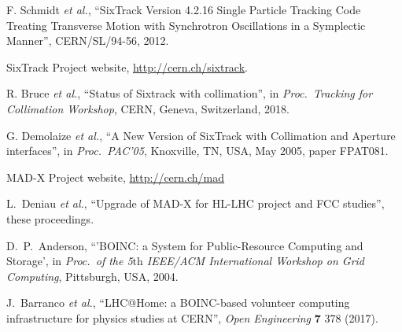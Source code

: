 \documentclass{ws-ijmpa}
\begin{document}
\begin{thebibliography}{99}


F. Schmidt {\it et al.},
``SixTrack Version 4.2.16 Single Particle Tracking Code Treating Transverse Motion with Synchrotron Oscillations in a Symplectic Manner'',
CERN/SL/94-56, 2012.

SixTrack Project website,
\url{http://cern.ch/sixtrack}.

R. Bruce {\it et al.},
``Status of Sixtrack with collimation'',
in \emph{Proc.~Tracking for Collimation Workshop}, CERN, Geneva, Switzerland, 2018.


G. Demolaize {\it et al.}, ``A New Version of SixTrack with Collimation and Aperture interfaces'', in {\it Proc.~PAC'05}, Knoxville, TN, USA, May 2005, paper FPAT081.

MAD-X Project website, \url{http://cern.ch/mad}


L.~Deniau {\it et al.},
``Upgrade of MAD-X for HL-LHC project and FCC studies'',
these proceedings.

 D.~P.~Anderson, ``'BOINC: a System for Public-Resource Computing and Storage',
in \emph{Proc.~of the 5$\textrm{th}$ IEEE/ACM International Workshop on Grid Computing}, Pittsburgh, USA, 2004.

J.~Barranco \emph{et al.},
``LHC@Home: a BOINC-based volunteer computing infrastructure for physics studies at CERN'',
{\it Open Engineering} {\bf 7} 378 (2017).


\end{thebibliography}
\end{document}
